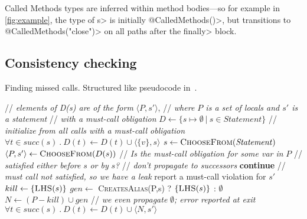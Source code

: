 Called Methods types are inferred within method bodies---so for example
in \cref{fig:example}, the type of \<s> is initially \<@CalledMethods({})>,
but transitions to \<@CalledMethods("close")> on all paths after the
\<finally> block.

\subsection{Consistency checking}
\label{sec:must-call-invoked}

\begin{algorithm}[t]
  \caption{Finding missed calls.  Structured like pseudocode in~\cite{TorlakC10}.}
  \label{alg:consistency-checker}
  \begin{algorithmic}[1]
  \State // \textit{elements of D(s) are of the form} $\langle P, s' \rangle$,
  \State // \textit{where $P$ is a set of locals and $s'$ is a statement}
  \State // \textit{with a must-call obligation}
  \State $D \gets \{ s \mapsto \emptyset\ |\ s \in \mathit{Statement} \}$
  \State // \textit{initialize from all calls with a must-call obligation}
   \label{li:start-init}
      \State $\forall t \in \mathit{succ}(s)\ .\ D(t) \leftarrow D(t) \cup \langle \{v\}, s \rangle$
    \EndFor \label{li:end-init}
  \EndFor
    \State $s \gets \textsc{ChooseFrom}(\mathit{Statement})$
    \State $\langle P, s' \rangle \gets \textsc{ChooseFrom}(D(s))$
    \State // \textit{Is the must-call obligation for some var in } $P$
    \State // \textit{satisfied either before }$s$\textit{ or by } $s$\textit{?}
     \label{li:check-satisfied}
    \State // \textit{don't propagate to successors}
    \State \textbf{continue} 
    \EndIf
     \label{li:end-scope}
      \State // \textit{must call not satisfied, so we have a leak}
      \State report a must-call violation for $s'$
    \Else
    \State $kill \gets \{\textsc{LHS}(s)\}$ \label{li:compute-kill}
    \State $gen \gets$ \textsc{CreatesAlias}(P,s) ? $\{\textsc{LHS}(s)\}$ : $\emptyset$ \label{li:compute-gen} 
    \State $N \gets (P - kill) \cup gen$ \label{li:compute-new-mc-aliases}
    \State // \textit{we even propagate }$\emptyset$\textit{; error reported at exit}
    \State $\forall t \in \mathit{succ}(s)\ .\ D(t) \leftarrow D(t) \cup \langle
    N, s' \rangle$ \label{li:prop-to-succs}
    \EndIf
  \EndWhile \label{li:alg-loop-end}
  \EndProcedure
  \end{algorithmic}
\end{algorithm}

